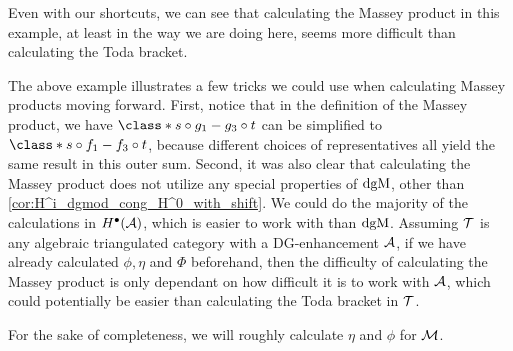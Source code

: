 Even with our shortcuts, we can see that calculating the Massey product in this example, at least in the way we are doing here, seems more difficult than calculating the Toda bracket.

The above example illustrates a few tricks we could use when calculating Massey products moving forward. First, notice that in the definition of the Massey product, we have \( \class*{ s \circ g_1 - g_3 \circ t} \) can be simplified to \( \class*{s \circ f_1 - f_3 \circ t} \), because different choices of representatives all yield the same result in this outer sum. Second, it was also clear that calculating the Massey product does not utilize any special properties of \( \operatorname{dgM} \), other than \autoref{cor:H^i_dgmod_cong_H^0_with_shift}. We could do the majority of the calculations in \( H^{\bullet}({\mathcal{A}}) \), which is easier to work with than \( \operatorname{dgM} \). Assuming \( {\mathcal{T}} \) is any algebraic triangulated category with a DG-enhancement \( {\mathcal{A}} \), if we have already calculated \( \phi, \eta \) and \( \Phi \) beforehand, then the difficulty of calculating the Massey product is only dependant on how difficult it is to work with \( {\mathcal{A}} \), which could potentially be easier than calculating the Toda bracket in \( {\mathcal{T}} \).

For the sake of completeness, we will roughly calculate \( \eta \) and \( \phi \) for \( {\mathcal{M}} \).

